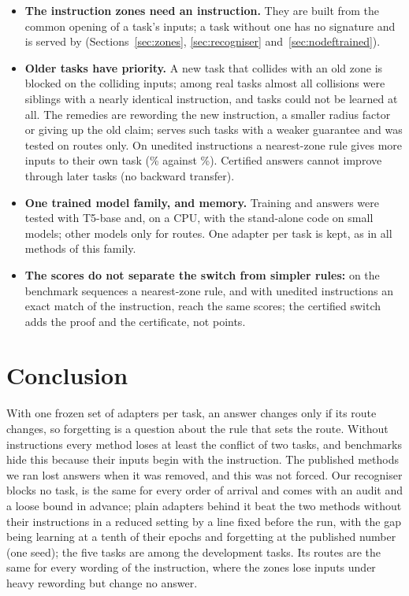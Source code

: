 \begin{itemize}
  allowed), but most later tasks were blocked on arrival (Section~\ref{sec:noinstruction}).
  \item \textbf{The instruction zones need an instruction.} They are built from the common opening of a
  task's inputs; a task without one has no signature and is served by \recog{}
  (Sections~\ref{sec:zones}, \ref{sec:recogniser} and~\ref{sec:nodeftrained}).
  \item \textbf{Older tasks have priority.} A new task that collides with an old zone is blocked on the
  colliding inputs; among \ManyTasks{} real tasks almost all collisions were siblings with a nearly
  identical instruction, and \ManyAllHeld{} tasks could not be learned at all. The remedies are
  rewording the new instruction, a smaller radius factor or giving up the old claim; \exactfirst{}
  serves such tasks with a weaker guarantee and was tested on routes only. On unedited instructions a
  nearest-zone rule gives more inputs to their own task (\ManyNearRightPct{}\% against
  \ManyCertRightPct{}\%). Certified answers cannot improve through later tasks (no backward transfer).
  \item \textbf{One trained model family, and memory.} Training and answers were tested with T5-base and,
  on a CPU, with the stand-alone code on small models; other models only for routes. One adapter per task
  is kept, as in all methods of this family.
  \item \textbf{The scores do not separate the switch from simpler rules:} on the benchmark sequences a
  nearest-zone rule, and with unedited instructions an exact match of the instruction, reach the same
  scores; the certified switch adds the proof and the certificate, not points.
\end{itemize}

\section{Conclusion}
\label{sec:conclusion}

With one frozen set of adapters per task, an answer changes only if its route changes, so forgetting is
a question about the rule that sets the route. Without instructions every method loses at least the
conflict of two tasks, and benchmarks hide this because their inputs begin with the instruction. The
published methods we ran lost answers when it was removed, and this was not forced. Our recogniser blocks
no task, is the same for every order of arrival and comes with an audit and a loose bound in advance;
plain adapters behind it beat the two methods without their instructions in a reduced setting by a line fixed before the run, with
the gap being learning at a tenth of their epochs and forgetting at the published number (one seed); the five tasks are among the development tasks. Its routes are
the same for every wording of the instruction, where the zones lose inputs under heavy rewording but change no answer.

